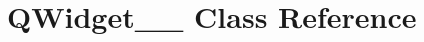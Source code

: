 \hypertarget{classGUI_1_1QtGui_1_1QWidget____10}{}\section{Q\+Widget\+\_\+\+\_ Class Reference}
\label{classGUI_1_1QtGui_1_1QWidget____10}
